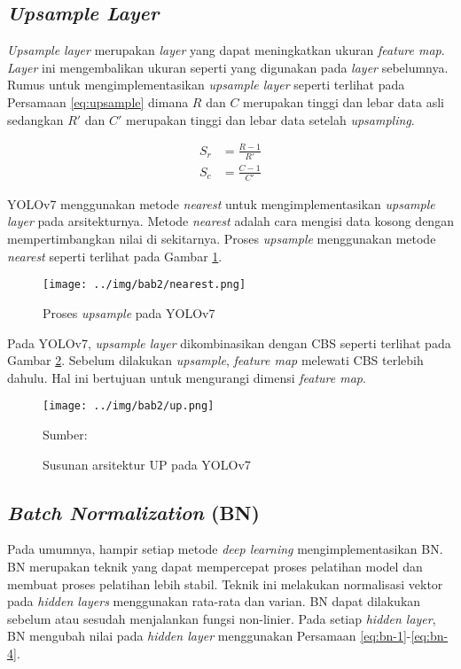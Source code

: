     \subsection{\textit{Upsample Layer}}
    \textit{Upsample layer} merupakan \textit{layer} yang dapat meningkatkan ukuran \textit{feature map}. \textit{Layer} ini mengembalikan ukuran seperti yang digunakan pada \textit{layer} sebelumnya. Rumus untuk mengimplementasikan \textit{upsample layer} seperti terlihat pada Persamaan \ref{eq:upsample} dimana $R$ dan $C$ merupakan tinggi dan lebar data asli sedangkan $R'$ dan $C'$ merupakan tinggi dan lebar data setelah \textit{upsampling}. 

    \begin{align}
        \label{eq:upsample}
        S_r &= \frac{R-1}{R'}\nonumber\\
        S_c &= \frac{C-1}{C'}
    \end{align}

    YOLOv7 menggunakan metode \textit{nearest} untuk mengimplementasikan \textit{upsample layer} pada arsitekturnya. Metode \textit{nearest} adalah cara mengisi data kosong dengan mempertimbangkan nilai di sekitarnya. Proses \textit{upsample} menggunakan metode \textit{nearest} seperti terlihat pada Gambar \ref{fig:il-nearest}.

    \begin{figure}[H]
        \begin{center}
            \texttt{[image: ../img/bab2/nearest.png]}
            \caption{Proses \textit{upsample} pada YOLOv7}
            \label{fig:il-nearest}
        \end{center}
    \end{figure}

    Pada YOLOv7, \textit{upsample layer} dikombinasikan dengan CBS seperti terlihat pada Gambar \ref{fig:up}. Sebelum dilakukan \textit{upsample}, \textit{feature map} melewati CBS terlebih dahulu. Hal ini bertujuan untuk mengurangi dimensi \textit{feature map}.

    \begin{figure}[H]
        \begin{center}
            \texttt{[image: ../img/bab2/up.png]}
            \caption{Susunan arsitektur UP pada YOLOv7}
            \label{fig:up}
            Sumber: \citep{Wang2022}
        \end{center}
    \end{figure}    

    \subsection{\textit{Batch Normalization} (BN)}
    Pada umumnya, hampir setiap metode \textit{deep learning} mengimplementasikan BN. BN merupakan teknik yang dapat mempercepat proses pelatihan model dan membuat proses pelatihan lebih stabil. Teknik ini melakukan normalisasi vektor pada \textit{hidden layers} menggunakan rata-rata dan varian. BN dapat dilakukan sebelum atau sesudah menjalankan fungsi non-linier. Pada setiap \textit{hidden layer}, BN mengubah nilai pada \textit{hidden layer} menggunakan Persamaan \ref{eq:bn-1}-\ref{eq:bn-4}.

